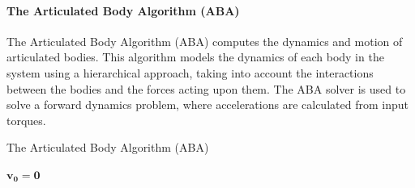 \documentclass[report.tex]{subfiles}
\begin{document}
    \paragraph*{\large{The Articulated Body Algorithm (ABA)}\\ }
    The Articulated Body Algorithm (ABA) computes the dynamics and motion of articulated bodies. This algorithm models the dynamics of each body in the system using a hierarchical approach, taking into account the interactions between the bodies and the forces acting upon them. The ABA solver is used to solve a forward dynamics problem, where accelerations are calculated from input torques\cite{featherstone1999divide}. 
    \begin{algorithm}[H]
        \caption{The Articulated Body Algorithm (ABA)\cite{featherstone2007book}}
        \label{alg:ABA}
        $\bm{v_0 = 0}$\\
    \end{algorithm}
\end{document}

